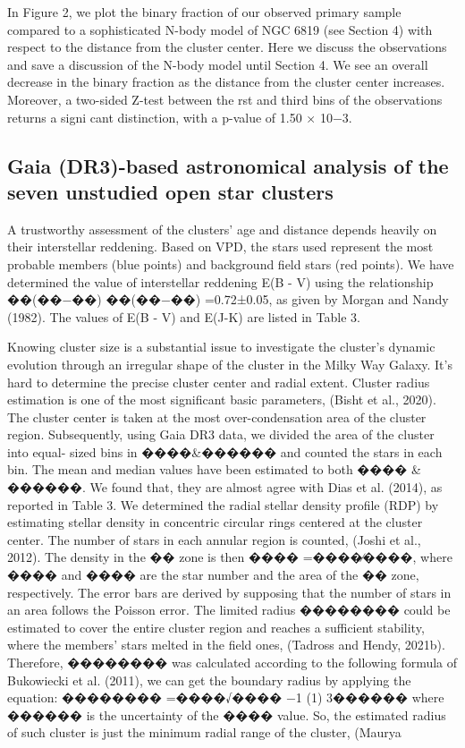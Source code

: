 \documentclass[../main.tex]{subfiles}
\begin{document}
{In Figure 2, we plot the binary fraction of our observed
primary sample compared to a sophisticated N-body model of
NGC 6819 (see Section 4) with respect to the distance from the
cluster center. Here we discuss the observations and save a
discussion of the N-body model until Section 4. We see an
overall decrease in the binary fraction as the distance from the
cluster center increases. Moreover, a two-sided Z-test between
the rst and third bins of the observations returns a signi cant
distinction, with a p-value of 1.50 × 10−3.


\subsection{Gaia (DR3)-based astronomical analysis of the seven unstudied open star
	clusters}
A trustworthy assessment of the clusters’ age and distance depends
heavily on their interstellar reddening. Based on VPD, the stars used
represent the most probable members (blue points) and background
field stars (red points). We have determined the value of interstellar
reddening E(B - V) using the relationship ��(��−��)
��(��−��) =0.72±0.05, as given
by Morgan and Nandy (1982). The values of E(B - V) and E(J-K) are
listed in Table 3.

% 

Knowing cluster size is a substantial issue to investigate the cluster’s
dynamic evolution through an irregular shape of the cluster in the
Milky Way Galaxy. It’s hard to determine the precise cluster center and
radial extent. Cluster radius estimation is one of the most significant
basic parameters, (Bisht et al., 2020). The cluster center is taken at
the most over-condensation area of the cluster region. Subsequently,
using Gaia DR3 data, we divided the area of the cluster into equal-
sized bins in ����&������ and counted the stars in each bin. The mean and
median values have been estimated to both ���� & ������. We found that,
they are almost agree with Dias et al. (2014), as reported in Table 3. We
determined the radial stellar density profile (RDP) by estimating stellar
density in concentric circular rings centered at the cluster center. The
number of stars in each annular region is counted, (Joshi et al., 2012).
The density in the �� zone is then ���� =����∕����, where ���� and ���� are the
star number and the area of the �� zone, respectively. The error bars
are derived by supposing that the number of stars in an area follows
the Poisson error. The limited radius �������� could be estimated to cover
the entire cluster region and reaches a sufficient stability, where the
members’ stars melted in the field ones, (Tadross and Hendy, 2021b).
Therefore, �������� was calculated according to the following formula
of Bukowiecki et al. (2011), we can get the boundary radius by applying
the equation:
�������� =����√����
−1 (1)
3������
where ������ is the uncertainty of the ���� value. So, the estimated radius of
such cluster is just the minimum radial range of the cluster, (Maurya

}
\end{document}
